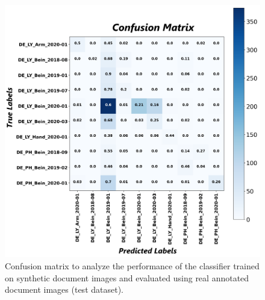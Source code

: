 \begin{figure}[H]
    \begin{center}
	\includegraphics[scale=0.25]{images/Appendix/Confusion_Matrix_Synthetic_Data_Classifier_2021-05-31_16-40-33.png}
	\caption[Confusion matrix to analyze the performance of the classifier trained on synthetic document images and evaluated using real annotated document images (test dataset).]{Confusion matrix to analyze the performance of the classifier trained on synthetic document images and evaluated using real annotated document images (test dataset).}
	\label{fig:CMSyntheticDocumentImagesClassifier}
	\end{center}
\end{figure}



